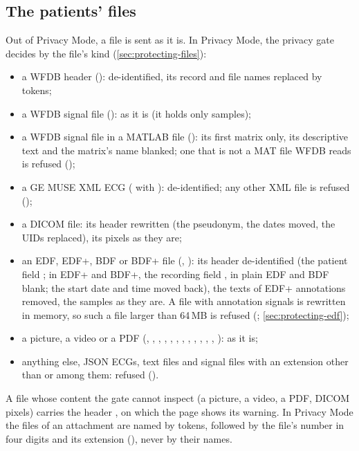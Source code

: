 \subsection{The patients' files}
\label{sec:http-api-files}

Out of Privacy Mode, a file is sent as it is. In Privacy Mode, the privacy gate decides by the
file's kind (\cref{sec:protecting-files}):
\begin{itemize}
\item a WFDB header (): de-identified, its record and file names replaced by tokens;
\item a WFDB signal file (): as it is (it holds only samples);
\item a WFDB signal file in a MATLAB file (): its first matrix only, its descriptive
  text and the matrix's name blanked; one that is not a MAT file WFDB reads is refused
  ();
\item a GE MUSE XML ECG ( with ): de-identified; any other XML
  file is refused ();
\item a DICOM file: its header rewritten (the pseudonym, the dates moved, the UIDs replaced),
  its pixels as they are;
\item an EDF, EDF+, BDF or BDF+ file (, ): its header de-identified
  (the patient field ; in EDF+ and BDF+, the recording field
  , in plain EDF and BDF blank; the start date and time moved
  back), the texts of EDF+ annotations removed, the samples as they are. A file with
  annotation signals is rewritten in memory, so such a file larger than 64\,MB is refused
  (; \cref{sec:protecting-edf});
\item a picture, a video or a PDF (, , , ,
  , , , , , , ,
  , ): as it is;
\item anything else, JSON ECGs, text files and signal files with an extension other than
   or  among them: refused ().
\end{itemize}
A file whose content the gate cannot inspect (a picture, a video, a PDF, DICOM pixels) carries
the header , on which the page shows its warning. In Privacy
Mode the files of an attachment are named by tokens,  followed by the file's number
in four digits and its extension (), never by their names.

